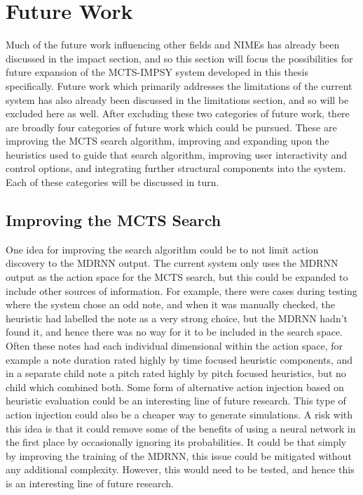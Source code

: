 \section{Future Work}
Much of the future work influencing other fields and NIMEs has already been discussed in the impact section, and so this section will focus the possibilities for future expansion of the MCTS-IMPSY system developed in this thesis specifically. Future work which primarily addresses the limitations of the current system has also already been discussed in the limitations section, and so will be excluded here as well. After excluding these two categories of future work, there are broadly four categories of future work which could be pursued. These are improving the MCTS search algorithm, improving and expanding upon the heuristics used to guide that search algorithm, improving user interactivity and control options, and integrating further structural components into the system. Each of these categories will be discussed in turn.

\subsection{Improving the MCTS Search}
One idea for improving the search algorithm could be to not limit action discovery to the MDRNN output. The current system only uses the MDRNN output as the action space for the MCTS search, but this could be expanded to include other sources of information. For example, there were cases during testing where the system chose an odd note, and when it was manually checked, the heuristic had labelled the note as a very strong choice, but the MDRNN hadn't found it, and hence there was no way for it to be included in the search space. Often these notes had each individual dimensional within the action space, for example a note duration rated highly by time focused heuristic components, and in a separate child note a pitch rated highly by pitch focused heuristics, but no child which combined both. Some form of alternative action injection based on heuristic evaluation could be an interesting line of future research. This type of action injection could also be a cheaper way to generate simulations. A risk with this idea is that it could remove some of the benefits of using a neural network in the first place by occasionally ignoring its probabilities. It could be that simply by improving the training of the MDRNN, this issue could be mitigated without any additional complexity. However, this would need to be tested, and hence this is an interesting line of future research.

